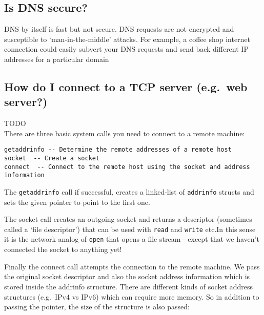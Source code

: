\subsection{Is DNS secure?}\label{is-dns-secure}

DNS by itself is fast but not secure. DNS requests are not encrypted and
susceptible to `man-in-the-middle' attacks. For example, a coffee shop
internet connection could easily subvert your DNS requests and send back
different IP addresses for a particular domain

\subsection{How do I connect to a TCP server (e.g.~web
server?)}\label{how-do-i-connect-to-a-tcp-server-e.g.web-server}

TODO\\There are three basic system calls you need to connect to a remote
machine:

\begin{verbatim}
getaddrinfo -- Determine the remote addresses of a remote host
socket  -- Create a socket
connect  -- Connect to the remote host using the socket and address information
\end{verbatim}

The \texttt{getaddrinfo} call if successful, creates a linked-list of
\texttt{addrinfo} structs and sets the given pointer to point to the
first one.

The socket call creates an outgoing socket and returns a descriptor
(sometimes called a `file descriptor') that can be used with
\texttt{read} and \texttt{write} etc.In this sense it is the network
analog of \texttt{open} that opens a file stream - except that we
haven't connected the socket to anything yet!

Finally the connect call attempts the connection to the remote machine.
We pass the original socket descriptor and also the socket address
information which is stored inside the addrinfo structure. There are
different kinds of socket address structures (e.g.~IPv4 vs IPv6) which
can require more memory. So in addition to passing the pointer, the size
of the structure is also passed:

\begin{Shaded}
\begin{Highlighting}[]
\end{Highlighting}
\end{Shaded}

